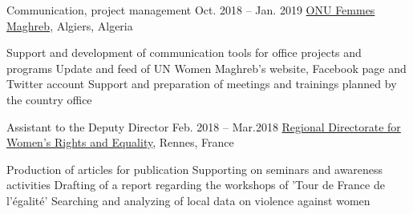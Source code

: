 \begin{joblist}
\item[Communication, project management]{Oct. 2018 -- Jan. 2019 }     
	{
	\href{http://maghreb.unwomen.org/fr}{ONU Femmes Maghreb}, Algiers, Algeria
	}     
	{
			 
		\vspace{-0.5cm}
		\begin{itemize}
			  \iftbftiny \setlength\itemsep{-3pt} \fi
			  \cvitem[\checkmark] Support and development of communication tools for office projects and programs     
 			  \cvitem[\checkmark] Update and feed of UN Women Maghreb's website, Facebook page and Twitter account                                                         
			  \cvitem[\checkmark] Support and preparation of meetings and trainings planned by the country office
		\end{itemize}      

	}

\item[Assistant to the Deputy Director]{Feb. 2018 -- Mar.2018 }     
  	{
	\href{https://www.egalite-femmes-hommes.gouv.fr/le-secretariat-d-etat/organisation-du-ministere/services-territoriaux/annuaire-des-equipes-regionales-et-departementales/}{Regional Directorate for Women's Rights and Equality}, Rennes, France
	}      
  	{
		\iftbftiny \setlength{\parskip}{-10pt} \fi
		\begin{itemize}
			  \iftbftiny \setlength\itemsep{-3pt} \fi
			  \cvitem[\checkmark] Production of articles for publication
			  \cvitem[\checkmark] Supporting on seminars and awareness activities
			  \cvitem[\checkmark] Drafting of a report regarding the workshops of 'Tour de France de l'égalité'
			  \cvitem[\checkmark] Searching and analyzing of local data on violence against women
		\end{itemize}       
	}



\end{joblist}
